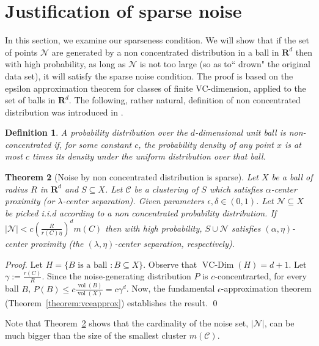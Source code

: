 \documentclass[12pt]{article}
\newtheorem{theorem}{Theorem}
\newtheorem{definition}[theorem]{Definition}
\newcommand{\mc}{\mathcal}
\newcommand{\mb}{\mathbf}
\DeclareMathOperator{\vcdim}{VC-Dim}
\DeclareMathOperator{\vol}{vol}
\begin{document}
\section{Justification of sparse noise}
\label{Noise_justify}
In this section, we examine our sparseness condition. We will show that if the set of points $\mc N$ are generated by a non concentrated distribution in a ball in $\mb R^d$ then with high probability, as long as $\mc N$ is not too large (so as to``
drown" the original data set), it will satisfy the sparse noise condition. The proof is based on the epsilon approximation theorem for classes of finite VC-dimension, applied to the set of balls in $\mb R^d$. The following, rather natural, definition of non concentrated distribution was introduced in \cite{balcan2012distributed}.
\begin{definition} 
A probability distribution over the $d$-dimensional unit ball is \emph{non-concentrated} if, for some constant $c$, the probability density of any point $x$ is at most $c$ times its density under the uniform distribution over that ball.
\end{definition}

\begin{theorem}[Noise by non concentrated distribution is sparse]
\label{theorem:sparse}
Let $X$ be a ball of radius $R$ in $\mb R^d$ and $S \subseteq X$. Let $\mc C$ be a clustering of $S$ which satisfies $\alpha$-center proximity (or $\lambda$-center separation). Given parameters $\epsilon, \delta \in (0,1)$. Let $\mc N \subseteq X$ be picked i.i.d according to a non concentrated probability distribution. If $|\mc N| < c  \left( \frac{R}{r(C) \eta} \right) ^d m(C)$
then with high probability, $S \cup \mc N$  satisfies $(\alpha, \eta)$-center proximity (the $(\lambda, \eta)$-center separation, respectively).
\end{theorem}
\begin{proof}
Let $H = \{B \text{ is a ball }: B \subseteq X\}$. Observe that $\vcdim(H) = d+1$. Let $\gamma := \frac{r(C)}{R}$. Since the noise-generating distribution $P$ is $c$-concentrarted, for every ball $B$, $P(B) \leq c \frac{\vol(B)}{\vol(X)} = c\gamma^d$. Now, the fundamental $\epsilon$-approximation theorem (Theorem~\ref{theorem:vceapprox}) establishes the result.
\qed
\end{proof}

\noindent Note that Theorem~\ref{theorem:sparse} shows that the cardinality of the noise set, $|\mc N|$, can be much bigger than the size of the smallest cluster $m(\mc C)$. 
\end{document}
